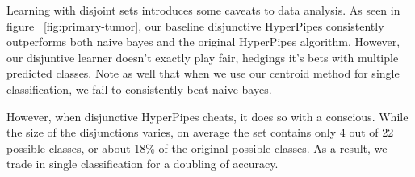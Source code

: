 \begin{figure*}
\centering
{}
\caption{Incremental results from a discrete dataset with many class values.}
\label{fig:primary-tumor}
\end{figure*}

\begin{figure*}
\centering
{}
\caption{Percentage of classes contained within disjunction.}
\label{fig:primary-tumor-setsize}
\end{figure*}

Learning with disjoint sets introduces some caveats to data analysis. As seen in figure ~\ref{fig:primary-tumor}, our baseline disjunctive HyperPipes consistently outperforms both naive bayes and the original HyperPipes algorithm. However, our disjuntive learner doesn't exactly play fair, hedgings it's bets with multiple predicted classes. Note as well that when we use our centroid method for single classification, we fail to consistently beat naive bayes.

However, when disjunctive HyperPipes cheats, it does so with a conscious. While the size of the disjunctions varies, on average the set contains only 4 out of 22 possible classes, or about 18\% of the original possible classes. As a result, we trade in single classification for a doubling of accuracy.
